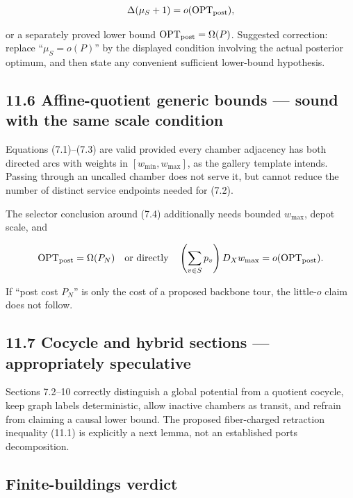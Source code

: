 \documentclass[11pt,a4paper]{article}
\begin{document}
\[
\Delta(\mu_S+1)=o(\operatorname{OPT}_{\rm post}),
\]

or a separately proved lower bound \(\operatorname{OPT}_{\rm post}=\Omega(P)\).  Suggested correction: replace “\(\mu_S=o(P)\)” by the displayed condition involving the actual posterior optimum, and then state any convenient sufficient lower-bound hypothesis.


\subsection*{11.6 Affine-quotient generic bounds — sound with the same scale condition}

Equations (7.1)–(7.3) are valid provided every chamber adjacency has both directed arcs with weights in \([w_{\min},w_{\max}]\), as the gallery template intends.  Passing through an uncalled chamber does not serve it, but cannot reduce the number of distinct service endpoints needed for (7.2).


The selector conclusion around (7.4) additionally needs bounded \(w_{\max}\), depot scale, and


\[
\operatorname{OPT}_{\rm post}=\Omega(P_N)
\quad\text{or directly}\quad
\left(\sum_{v\in S}p_v\right)D_Xw_{\max}
=o(\operatorname{OPT}_{\rm post}).
\]

If “post cost \(P_N\)” is only the cost of a proposed backbone tour, the little-\(o\) claim does not follow.


\subsection*{11.7 Cocycle and hybrid sections — appropriately speculative}

Sections 7.2–10 correctly distinguish a global potential from a quotient cocycle, keep graph labels deterministic, allow inactive chambers as transit, and refrain from claiming a causal lower bound.  The proposed fiber-charged retraction inequality (11.1) is explicitly a next lemma, not an established ports decomposition.


\subsection*{Finite-buildings verdict}
\end{document}
